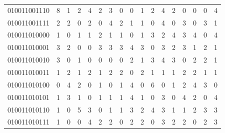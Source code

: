 \documentclass[10pt,a4paper]{article}
\begin{document}
\begin{longtable}{ |c|c|c|c|c|c|c|c|c|c|c|c|c|c|c|c|c| }
    010011001110              & 8                            & 1                                & 2                            & 4                              & 2   & 3   & 0   & 0   & 1   & 2   & 4   & 2   & 0   & 0   & 0   & 4   \\
    010011001111              & 2                            & 2                                & 0                            & 2                              & 0   & 4   & 2   & 1   & 1   & 0   & 4   & 0   & 3   & 0   & 3   & 1   \\
    010011010000              & 1                            & 0                                & 1                            & 1                              & 2   & 1   & 1   & 0   & 1   & 3   & 2   & 4   & 3   & 4   & 0   & 4   \\
    010011010001              & 3                            & 2                                & 0                            & 0                              & 3   & 3   & 3   & 4   & 3   & 0   & 3   & 2   & 3   & 1   & 2   & 1   \\
    010011010010              & 3                            & 0                                & 1                            & 0                              & 0   & 0   & 0   & 2   & 1   & 3   & 4   & 3   & 0   & 2   & 2   & 1   \\
    010011010011              & 1                            & 2                                & 1                            & 2                              & 1   & 2   & 2   & 0   & 2   & 1   & 1   & 1   & 2   & 2   & 1   & 1   \\
    010011010100              & 0                            & 4                                & 2                            & 0                              & 1   & 0   & 1   & 4   & 0   & 6   & 0   & 1   & 2   & 4   & 3   & 0   \\
    010011010101              & 1                            & 3                                & 1                            & 0                              & 1   & 1   & 1   & 4   & 1   & 0   & 3   & 0   & 4   & 2   & 0   & 4   \\
    010011010110              & 1                            & 0                                & 5                            & 3                              & 0   & 1   & 1   & 3   & 2   & 4   & 3   & 1   & 1   & 2   & 3   & 3   \\
    010011010111              & 1                            & 0                                & 0                            & 4                              & 2   & 2   & 0   & 2   & 2   & 0   & 3   & 2   & 2   & 0   & 2   & 3   \\

\end{longtable}
\end{document}
